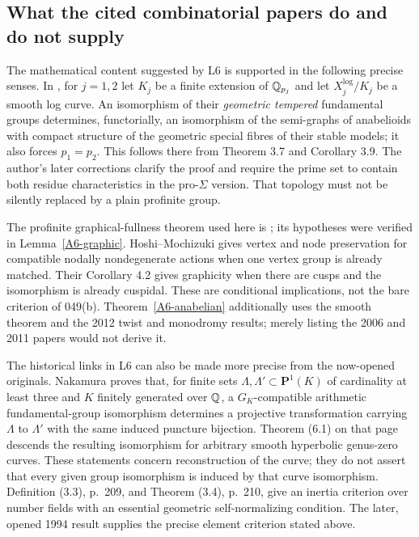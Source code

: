 \subsection{What the cited combinatorial papers do and do not supply}
The mathematical content suggested by L6 is supported in the following precise senses. In \cite[Corollary 3.11]{Mochizuki2006A567}, for $j=1,2$ let $K_j$ be a finite extension of ${\mathbb{Q}}_{p_j}$ and let $X_j^{\log}/K_j$ be a smooth log curve. An isomorphism of their \emph{geometric tempered} fundamental groups determines, functorially, an isomorphism of the semi-graphs of anabelioids with compact structure of the geometric special fibres of their stable models; it also forces $p_1=p_2$. This follows there from Theorem 3.7 and Corollary 3.9. The author's later corrections \cite[items (2), (3), (6)]{Mochizuki2020CommentsA567} clarify the proof and require the prime set to contain both residue characteristics in the pro-$\Sigma$ version. That topology must not be silently replaced by a plain profinite group.

The profinite graphical-fullness theorem used here is \cite[Corollary 2.7(ii)]{Mochizuki2007A567}; its hypotheses were verified in Lemma~\ref{A6-graphic}. Hoshi--Mochizuki \cite[Theorem 4.1]{HoshiMochizuki2011A567} gives vertex and node preservation for compatible nodally nondegenerate actions when one vertex group is already matched. Their Corollary 4.2 gives graphicity when there are cusps and the isomorphism is already cuspidal. These are conditional implications, not the bare criterion of 049(b). Theorem~\ref{A6-anabelian} additionally uses the smooth theorem and the 2012 twist and monodromy results; merely listing the 2006 and 2011 papers would not derive it.

The historical links in L6 can also be made more precise from the
now-opened originals. Nakamura \cite[Theorem (5.10), p.~215]{Nakamura1990A567}
proves that, for finite sets $\Lambda,\Lambda'\subset\mathbf P^1(K)$
of cardinality at least three and $K$ finitely generated over ${\mathbb{Q}}$,
a $G_K$-compatible arithmetic fundamental-group isomorphism determines
a projective transformation carrying $\Lambda$ to $\Lambda'$ with
the same induced puncture bijection. Theorem (6.1) on that page descends
the resulting isomorphism for arbitrary smooth hyperbolic genus-zero
curves. These statements concern reconstruction of the curve; they
do not assert that every given group isomorphism is induced by that
curve isomorphism. Definition (3.3), p.~209, and Theorem (3.4), p.~210,
give an inertia criterion over number fields with an essential
geometric self-normalizing condition. The later, opened 1994 result
supplies the precise element criterion stated above.

